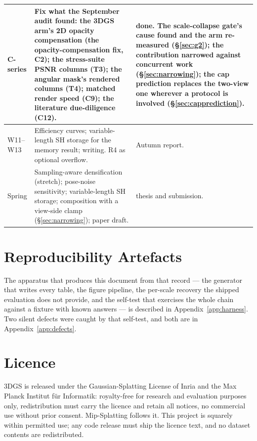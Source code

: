 \begin{table}[htbp]
\begin{tabularx}{\linewidth}{L{0.45}L{1.40}L{1.15}}
    \midrule
    C-series & Fix what the September audit found: the 3DGS arm's 2D opacity compensation (the opacity-compensation fix, C2); the stress-suite PSNR columns (T3); the angular mask's rendered columns (T4); matched render speed (C9); the literature due-diligence (C12). & \textbf{done.} The scale-collapse gate's cause found and the arm re-measured (\S\ref{sec:g2}); the contribution narrowed against concurrent work (\S\ref{sec:narrowing}); the cap prediction replaces the two-view one wherever a protocol is involved (\S\ref{sec:capprediction}). \\
    \midrule
    W11--W13 & Efficiency curves; variable-length SH storage for the memory result; writing. R4 as optional overflow. & Autumn report. \\
    Spring & Sampling-aware densification (stretch); pose-noise sensitivity; variable-length SH storage; composition with a view-side clamp (\S\ref{sec:narrowing}); paper draft. & thesis and submission. \\
    \bottomrule
  \end{tabularx}
\end{table}

\section{Reproducibility Artefacts}
The apparatus that produces this document from that record --- the generator
that writes every table, the figure pipeline, the per-scale recovery the
shipped evaluation does not provide, and the self-test that exercises the whole
chain against a fixture with known answers --- is described in
Appendix~\ref{app:harness}. Two silent defects were caught by that self-test, and both are in Appendix~\ref{app:defects}.

\section{Licence}
3DGS is released under the Gaussian-Splatting License of Inria and the Max Planck
Institut f\"ur Informatik: royalty-free for research and evaluation purposes
only, redistribution must carry the licence and retain all notices, no commercial
use without prior consent. Mip-Splatting follows it. This project is squarely
within permitted use; any code release must ship the licence text, and no dataset
contents are redistributed.
